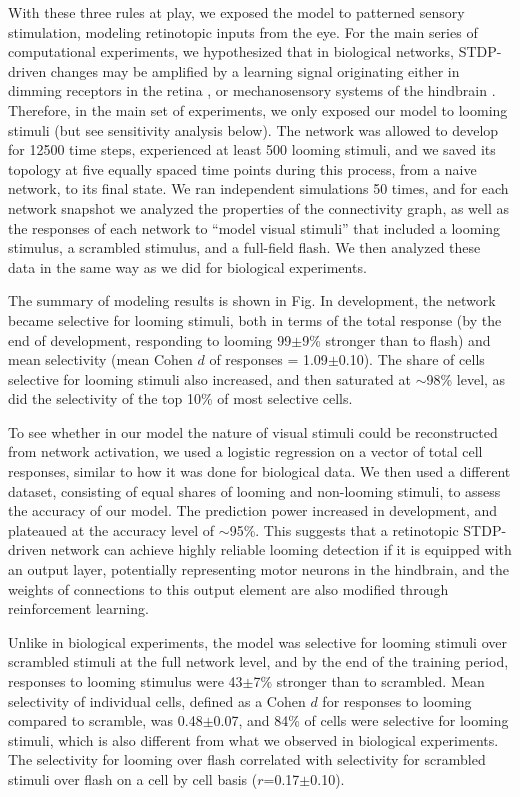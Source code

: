 \documentclass{article}
\begin{document}
With these three rules at play, we exposed the model to patterned sensory stimulation, modeling retinotopic inputs from the eye. For the main series of computational experiments, we hypothesized that in biological networks, STDP-driven changes may be amplified by a learning signal \citep{savin2014stdpreward,aswolinskiy2015stdpreward} originating either in dimming receptors in the retina \citep{baranauskas2012}, or mechanosensory systems of the hindbrain \citep{pratt2009multisens,felch2016,truszkowski2017}. Therefore, in the main set of experiments, we only exposed our model to looming stimuli (but see sensitivity analysis below). The network was allowed to develop for 12500 time steps, experienced at least 500 looming stimuli, and we saved its topology at five equally spaced time points during this process, from a naive network, to its final state. We ran independent simulations 50 times, and for each network snapshot we analyzed the properties of the connectivity graph, as well as the responses of each network to “model visual stimuli” that included a looming stimulus, a scrambled stimulus, and a full-field flash. We then analyzed these data in the same way as we did for biological experiments.

The summary of modeling results is shown in Fig. In development, the network became selective for looming stimuli, both in terms of the total response (by the end of development, responding to looming 99$\pm$9\% stronger than to flash) and mean selectivity (mean Cohen $d$ of responses = 1.09$\pm$0.10). The share of cells selective for looming stimuli also increased, and then saturated at $\sim$98\% level, as did the selectivity of the top 10\% of most selective cells.

To see whether in our model the nature of visual stimuli could be reconstructed from network activation, we used a logistic regression on a vector of total cell responses, similar to how it was done for biological data. We then used a different dataset, consisting of equal shares of looming and non-looming stimuli, to assess the accuracy of our model. The prediction power increased in development, and plateaued at the accuracy level of $\sim$95\%. This suggests that a retinotopic STDP-driven network can achieve highly reliable looming detection if it is equipped with an output layer, potentially representing motor neurons in the hindbrain, and the weights of connections to this output element are also modified through reinforcement learning.

Unlike in biological experiments, the model was selective for looming stimuli over scrambled stimuli at the full network level, and by the end of the training period, responses to looming stimulus were 43$\pm$7\% stronger than to scrambled. Mean selectivity of individual cells, defined as a Cohen $d$ for responses to looming compared to scramble, was 0.48$\pm$0.07, and 84\% of cells were selective for looming stimuli, which is also different from what we observed in biological experiments. The selectivity for looming over flash correlated with selectivity for scrambled stimuli over flash on a cell by cell basis ($r$=0.17$\pm$0.10).
\end{document}
